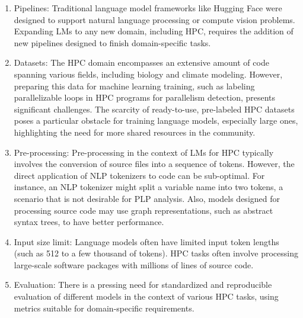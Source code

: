 \begin{enumerate}
    \item Pipelines: Traditional language model frameworks like Hugging Face were designed to support natural language processing or compute vision problems. Expanding LMs to any new domain, including HPC,  requires the addition of new pipelines designed to finish domain-specific tasks.   
    \item Datasets: The HPC domain encompasses an extensive amount of code spanning various fields, including biology and climate modeling. However, preparing this data for machine learning training, such as labeling parallelizable loops in HPC programs for parallelism detection, presents significant challenges. The scarcity of ready-to-use, pre-labeled HPC datasets poses a particular obstacle for training language models, especially large ones, highlighting the need for more shared resources in the community.
    \item Pre-processing: Pre-processing in the context of LMs for HPC typically involves the conversion of source files into a sequence of tokens. However, the direct application of NLP tokenizers to code can be sub-optimal. For instance, an NLP tokenizer might split a variable name into two tokens, a scenario that is not desirable for PLP analysis.  Also, models designed for processing source code may use graph representations, such as abstract syntax trees, to have better performance.
    \item Input size limit: Language models often have limited input token lengths (such as 512 to a few thousand of tokens). HPC tasks often involve processing large-scale software packages with millions of lines of source code. 
    \item Evaluation: There is a pressing need for standardized and reproducible evaluation of different models in the context of various HPC tasks, using metrics suitable for domain-specific requirements. 
\end{enumerate}

